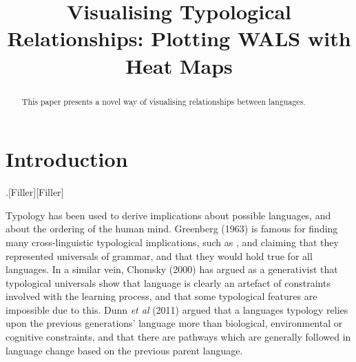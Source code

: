 \documentclass[11pt]{article}
\title{Visualising Typological Relationships: Plotting WALS with Heat Maps}
\date{}
\begin{document}
\maketitle


\begin{abstract}
This paper presents a novel way of visualising relationships between languages. 

\end{abstract}


\section{Introduction}
.[Filler][Filler]

Typology has been used to derive implications about possible languages, and about the ordering of the human mind. Greenberg (1963) \nocite{greenberg} is famous for finding many cross-linguistic typological implications, such as %
, and claiming that they represented universals of grammar, and that they would hold true for all languages. In a similar vein, Chomsky (2000) \nocite{chomsky}%
has argued as a generativist that typological universals show that language is clearly an artefact of constraints involved with the learning process, and that some typological features are impossible due to this. Dunn {\it et al} (2011) %
argued that a languages typology relies upon the previous generations' language more than biological, environmental or cognitive constraints, and that there are pathways which are generally followed in language change based on the previous parent language. 
\end{document}
